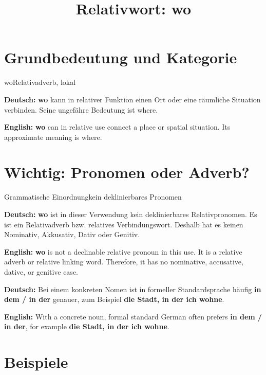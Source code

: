 \documentclass[a4paper,11pt]{article}
\title{Relativwort: \glqq wo\grqq{}}
\date{}
\newcommand{\GermanText}[1]{\textbf{Deutsch: }#1\par}
\newcommand{\EnglishText}[1]{{\small\color{SoftGray}\textbf{English: }#1\par}}
\begin{document}
\maketitle

\tableofcontents

\newpage

\section{Grundbedeutung und Kategorie}

\begin{grammarentry}{wo}{Relativadverb, lokal}

\GermanText{\textbf{wo} kann in relativer Funktion einen Ort oder eine räumliche Situation verbinden. Seine ungefähre Bedeutung ist \glqq where\grqq{}.}

\EnglishText{\textbf{wo} can in relative use connect a place or spatial situation. Its approximate meaning is \glqq where\grqq{}.}

\end{grammarentry}

\section{Wichtig: Pronomen oder Adverb?}

\begin{grammarentry}{Grammatische Einordnung}{kein deklinierbares Pronomen}

\GermanText{\textbf{wo} ist in dieser Verwendung kein deklinierbares Relativpronomen. Es ist ein Relativadverb bzw. relatives Verbindungswort. Deshalb hat es keinen Nominativ, Akkusativ, Dativ oder Genitiv.}

\EnglishText{\textbf{wo} is not a declinable relative pronoun in this use. It is a relative adverb or relative linking word. Therefore, it has no nominative, accusative, dative, or genitive case.}

\GermanText{Bei einem konkreten Nomen ist in formeller Standardsprache häufig \textbf{in dem / in der} genauer, zum Beispiel \textbf{die Stadt, in der ich wohne}.}

\EnglishText{With a concrete noun, formal standard German often prefers \textbf{in dem / in der}, for example \textbf{die Stadt, in der ich wohne}.}

\end{grammarentry}

\section{Beispiele}
\end{document}
